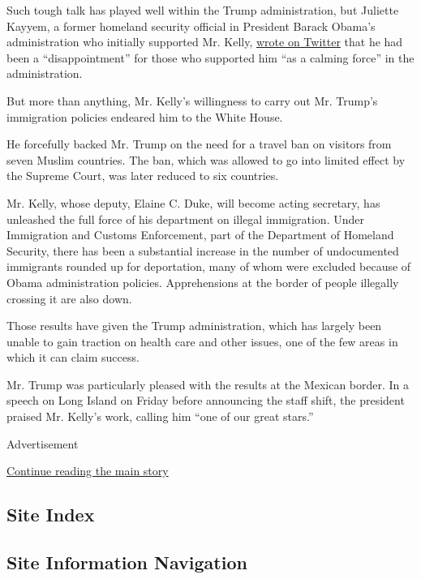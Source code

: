 Such tough talk has played well within the Trump administration, but
Juliette Kayyem, a former homeland security official in President Barack
Obama's administration who initially supported Mr. Kelly,
\href{https://twitter.com/juliettekayyem/status/891040377402273792}{wrote
on Twitter} that he had been a ``disappointment'' for those who
supported him ``as a calming force'' in the administration.

But more than anything, Mr. Kelly's willingness to carry out Mr. Trump's
immigration policies endeared him to the White House.

He forcefully backed Mr. Trump on the need for a travel ban on visitors
from seven Muslim countries. The ban, which was allowed to go into
limited effect by the Supreme Court, was later reduced to six countries.

Mr. Kelly, whose deputy, Elaine C. Duke, will become acting secretary,
has unleashed the full force of his department on illegal immigration.
Under Immigration and Customs Enforcement, part of the Department of
Homeland Security, there has been a substantial increase in the number
of undocumented immigrants rounded up for deportation, many of whom were
excluded because of Obama administration policies. Apprehensions at the
border of people illegally crossing it are also down.

Those results have given the Trump administration, which has largely
been unable to gain traction on health care and other issues, one of the
few areas in which it can claim success.

Mr. Trump was particularly pleased with the results at the Mexican
border. In a speech on Long Island on Friday before announcing the staff
shift, the president praised Mr. Kelly's work, calling him ``one of our
great stars.''

Advertisement

\protect\hyperlink{after-bottom}{Continue reading the main story}

\hypertarget{site-index}{%
\subsection{Site Index}\label{site-index}}

\hypertarget{site-information-navigation}{%
\subsection{Site Information
Navigation}\label{site-information-navigation}}

